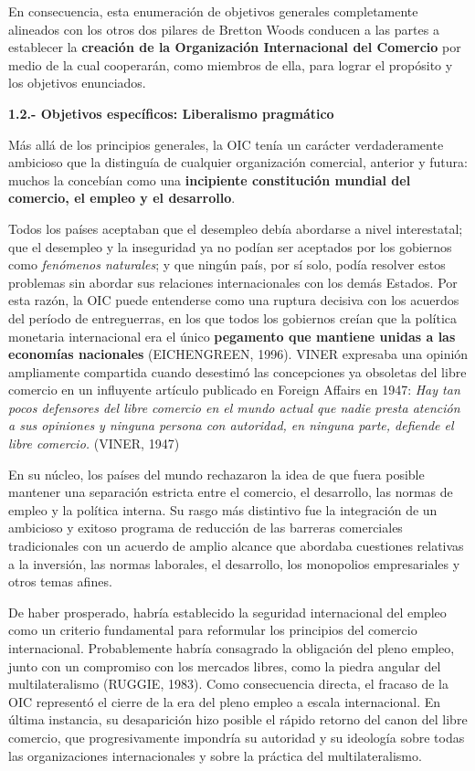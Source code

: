 \documentclass[10pt,a4paper]{article}
\begin{document}
En consecuencia, esta enumeración de objetivos generales completamente alineados con los otros dos pilares de Bretton Woods conducen a las partes a establecer la \textbf{creación de la Organización Internacional del Comercio} por medio de la cual cooperarán, como miembros de ella, para lograr el propósito y los objetivos enunciados.

\textbf{1.2.- Objetivos específicos: Liberalismo pragmático}

Más allá de los principios generales, la OIC tenía un carácter verdaderamente ambicioso que la distinguía de cualquier organización comercial, anterior y futura: muchos la concebían como una \textbf{incipiente constitución mundial del comercio, el empleo y el desarrollo}.

Todos los países aceptaban que el desempleo debía abordarse a nivel interestatal; que el desempleo y la inseguridad ya no podían ser aceptados por los gobiernos como \textit{fenómenos naturales}; y que ningún país, por sí solo, podía resolver estos problemas sin abordar sus relaciones internacionales con los demás Estados. Por esta razón, la OIC puede entenderse como una ruptura decisiva con los acuerdos del período de entreguerras, en los que todos los gobiernos creían que la política monetaria internacional era el único \textbf{pegamento que mantiene unidas a las economías nacionales} (EICHENGREEN, 1996). VINER expresaba una opinión ampliamente compartida cuando desestimó las concepciones ya obsoletas del libre comercio en un influyente artículo publicado en Foreign Affairs en 1947: \textit{Hay tan pocos defensores del libre comercio en el mundo actual que nadie presta atención a sus opiniones y ninguna persona con autoridad, en ninguna parte, defiende el libre comercio.} (VINER, 1947)

En su núcleo, los países del mundo rechazaron la idea de que fuera posible mantener una separación estricta entre el comercio, el desarrollo, las normas de empleo y la política interna. Su rasgo más distintivo fue la integración de un ambicioso y exitoso programa de reducción de las barreras comerciales tradicionales con un acuerdo de amplio alcance que abordaba cuestiones relativas a la inversión, las normas laborales, el desarrollo, los monopolios empresariales y otros temas afines.

De haber prosperado, habría establecido la seguridad internacional del empleo como un criterio fundamental para reformular los principios del comercio internacional. Probablemente habría consagrado la obligación del pleno empleo, junto con un compromiso con los mercados libres, como la piedra angular del multilateralismo (RUGGIE, 1983). Como consecuencia directa, el fracaso de la OIC representó el cierre de la era del pleno empleo a escala internacional. En última instancia, su desaparición hizo posible el rápido retorno del canon del libre comercio, que progresivamente impondría su autoridad y su ideología sobre todas las organizaciones internacionales y sobre la práctica del multilateralismo.
\end{document}
